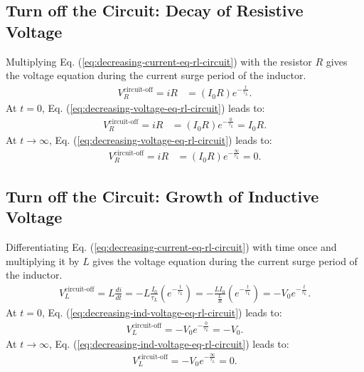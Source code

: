 \documentclass[12pt,b4paper]{article}
\begin{document}
\subsection{Turn off the Circuit: Decay of Resistive Voltage}
Multiplying Eq. (\ref{eq:decreasing-current-eq-rl-circuit}) with the resistor $R$ gives the voltage equation during the current surge period of the inductor.
\begin{align}
    V_R^\text{circuit-off}=iR&=(I_0R)e^{\displaystyle-\frac{t}{\tau_L}}.\label{eq:decreasing-voltage-eq-rl-circuit}
\end{align}
At $t=0$, Eq. (\ref{eq:decreasing-voltage-eq-rl-circuit}) leads to:
\begin{align*}
    V_R^\text{circuit-off}=iR&=(I_0R)e^{\displaystyle-\frac{0}{\tau_L}}=I_0R.
\end{align*}
At $t\to\infty$, Eq. (\ref{eq:decreasing-voltage-eq-rl-circuit}) leads to:
\begin{align*}
    V_R^\text{circuit-off}=iR&=(I_0R)e^{\displaystyle-\frac{\infty}{\tau_L}}=0.
\end{align*}
\subsection{Turn off the Circuit: Growth of Inductive Voltage}
Differentiating Eq. (\ref{eq:decreasing-current-eq-rl-circuit}) with time once and multiplying it by $L$ gives the voltage equation during the current surge period of the inductor.
\begin{align}
    V_L^\text{circuit-off}=L\frac{di}{dt}=-L\frac{I_0}{\tau_L}\left(e^{\displaystyle-\frac{t}{\tau_L}}\right)=-\frac{LI_0}{\displaystyle \frac{L}{R}}\left(e^{\displaystyle-\frac{t}{\tau_L}}\right)=-V_0e^{\displaystyle-\frac{t}{\tau_L}}.\label{eq:decreasing-ind-voltage-eq-rl-circuit}
\end{align}
At $t=0$, Eq. (\ref{eq:decreasing-ind-voltage-eq-rl-circuit}) leads to:
\begin{align*}
    V_L^\text{circuit-off}=-V_0e^{\displaystyle-\frac{0}{\tau_L}}=-V_0.
\end{align*}
At $t\to\infty$, Eq. (\ref{eq:decreasing-ind-voltage-eq-rl-circuit}) leads to:
\begin{align*}
    V_L^\text{circuit-off}=-V_0e^{\displaystyle-\frac{\infty}{\tau_L}}=0.
\end{align*}
\end{document}
